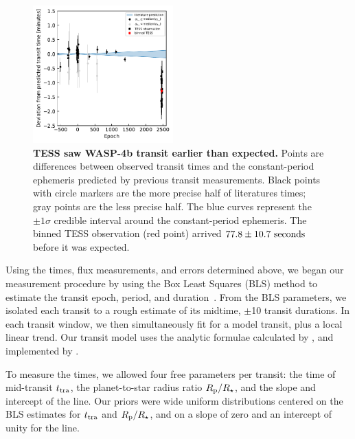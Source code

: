 \documentclass[12pt,twocolumn,tighten]{aastex62}
\begin{document}
\begin{figure}[t]
    \begin{center}
        \leavevmode
        \includegraphics[width=0.48\textwidth]{f2.pdf}
    \end{center}
    \vspace{-0.5cm}
    \caption{
        {\bf TESS saw WASP-4b transit earlier than expected.}
        Points are differences between observed transit times and
        the constant-period ephemeris predicted by previous transit
        measurements.
        Black points with circle markers are the more precise half of
        literatures times; gray points are the less precise half.
        The blue curves represent the $\pm 1\sigma$ credible interval
        around the constant-period ephemeris.
        The binned TESS observation (red point) arrived
        $77.8 \pm 10.7\ {\rm seconds}$ before it was expected.
        \label{fig:arrived_early}
    }
\end{figure}

Using the times, flux measurements, and errors determined above, we
began our measurement procedure by using the Box Least Squares (BLS)
method to estimate the transit epoch, period, and
duration~\citep{kovacs_box-fitting_2002}.
From the BLS parameters, we isolated each transit to a rough estimate
of its midtime, $\pm$10 transit durations.  In each transit window, we
then simultaneously fit for a model transit, plus a local linear
trend.  Our transit model uses the analytic formulae calculated by
\citet{mandel_analytic_2002}, and implemented by
\citet{kreidberg_batman_2015}.

To measure the times, we allowed four free parameters per transit: the
time of mid-transit $t_{\rm tra}$, the planet-to-star radius ratio
$R_{\rm p}/R_\star$, and the slope and intercept of the line. Our
priors were wide uniform distributions centered on the BLS estimates
for $t_{\rm tra}$ and $R_{\rm p}/R_\star$, and on a slope of zero and
an intercept of unity for the line.
\end{document}
